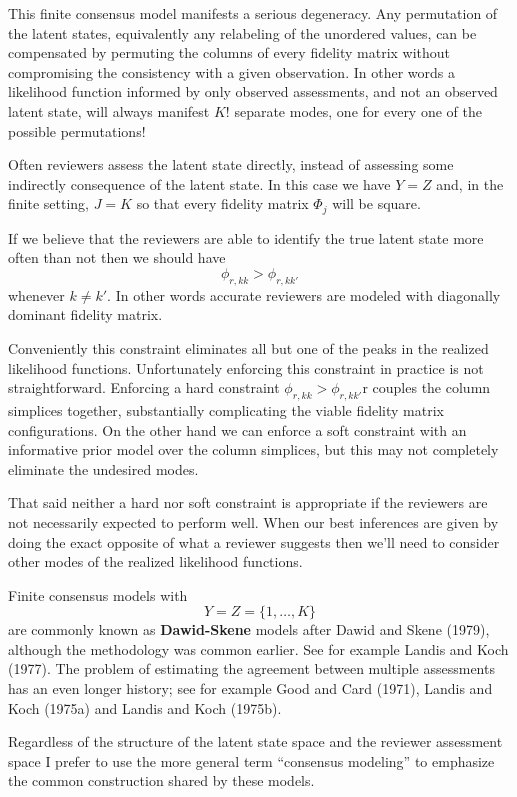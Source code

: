 \documentclass[
  letterpaper,
  DIV=11,
  numbers=noendperiod]{scrartcl}
\begin{document}
This finite consensus model manifests a serious degeneracy. Any
permutation of the latent states, equivalently any relabeling of the
unordered values, can be compensated by permuting the columns of every
fidelity matrix without compromising the consistency with a given
observation. In other words a likelihood function informed by only
observed assessments, and not an observed latent state, will always
manifest \(K!\) separate modes, one for every one of the possible
permutations!

Often reviewers assess the latent state directly, instead of assessing
some indirectly consequence of the latent state. In this case we have
\(Y = Z\) and, in the finite setting, \(J = K\) so that every fidelity
matrix \(\Phi_{j}\) will be square.

If we believe that the reviewers are able to identify the true latent
state more often than not then we should have \[
\phi_{r, kk} > \phi_{r, kk'}
\] whenever \(k \ne k'\). In other words accurate reviewers are modeled
with diagonally dominant fidelity matrix.

Conveniently this constraint eliminates all but one of the peaks in the
realized likelihood functions. Unfortunately enforcing this constraint
in practice is not straightforward. Enforcing a hard constraint
\(\phi_{r, kk} > \phi_{r, kk'}\)r couples the column simplices together,
substantially complicating the viable fidelity matrix configurations. On
the other hand we can enforce a soft constraint with an informative
prior model over the column simplices, but this may not completely
eliminate the undesired modes.

That said neither a hard nor soft constraint is appropriate if the
reviewers are not necessarily expected to perform well. When our best
inferences are given by doing the exact opposite of what a reviewer
suggests then we'll need to consider other modes of the realized
likelihood functions.

Finite consensus models with \[
Y = Z = \{ 1, \ldots, K \}
\] are commonly known as \textbf{Dawid-Skene} models after Dawid and
Skene (1979), although the methodology was common earlier. See for
example Landis and Koch (1977). The problem of estimating the agreement
between multiple assessments has an even longer history; see for example
Good and Card (1971), Landis and Koch (1975a) and Landis and Koch
(1975b).

Regardless of the structure of the latent state space and the reviewer
assessment space I prefer to use the more general term ``consensus
modeling'' to emphasize the common construction shared by these models.
\end{document}
